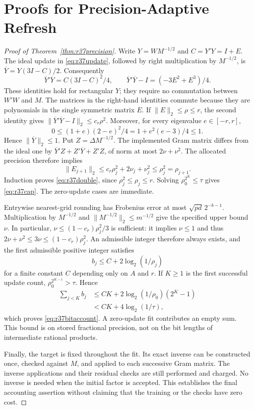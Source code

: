 \documentclass[ecta,nameyear,draft]{econsocart}
\theoremstyle{definition}
\theoremstyle{remark}
\begin{document}
\section{Proofs for Precision-Adaptive Refresh}\label{sec:r37proof}
\begin{proof}[Proof of Theorem~\ref{thm:r37precision}]
Write $Y=WM^{-1/2}$ and $C=Y'Y=I+E$. The ideal update in
\eqref{eq:r37update}, followed by right multiplication by $M^{-1/2}$,
is $\overline Y=Y(3I-C)/2$. Consequently
\[
 \overline Y'\overline Y=C(3I-C)^2/4,
 \qquad \overline Y'\overline Y-I=(-3E^2+E^3)/4.
\]
These identities hold for rectangular $Y$; they require no commutation
between $W'W$ and $M$. The matrices in the right-hand identities commute
because they are polynomials in the single symmetric matrix $E$.
If $\|E\|_2\leq\rho\leq r$, the second identity gives
$\|\overline Y'\overline Y-I\|_2\leq c_r\rho^2$.
Moreover, for every eigenvalue $e\in[-r,r]$,
\[
 0\leq(1+e)(2-e)^2/4=1+e^2(e-3)/4\leq1.
\]
Hence $\|\overline Y\|_2\leq1$. Put $Z=\Delta M^{-1/2}$.
The implemented Gram matrix differs from the ideal one by
$\overline Y'Z+Z'\overline Y+Z'Z$, of norm at most $2\nu+\nu^2$.
The allocated precision therefore implies
\[
 \|E_{j+1}\|_2\leq c_r\rho_j^2+2\nu_j+\nu_j^2
                         \leq\rho_j^2=\rho_{j+1}.
\]
Induction proves \eqref{eq:r37double}, since $\rho_j^2\leq\rho_j\leq r$.
Solving $\rho_0^{2^K}\leq\tau$ gives \eqref{eq:r37cap}. The zero-update
cases are immediate.

Entrywise nearest-grid rounding has Frobenius error at most
$\sqrt{pd}\,2^{-b-1}$. Multiplication by $M^{-1/2}$ and
$\|M^{-1/2}\|_2\leq m^{-1/2}$ give the specified upper bound $\nu$.
In particular, $\nu\leq(1-c_r)\rho_j^2/3$ is sufficient: it implies
$\nu\leq1$ and thus $2\nu+\nu^2\leq3\nu\leq(1-c_r)\rho_j^2$.
An admissible integer therefore always exists, and the first admissible
positive integer satisfies
\[
 b_j\leq C+2\log_2(1/\rho_j)
\]
for a finite constant $C$ depending only on $A$ and $r$. If $K\geq1$ is
the first successful update count, $\rho_0^{2^{K-1}}>\tau$. Hence
\begin{align*}
 \sum_{j<K} b_j
 &\leq CK+2\log_2(1/\rho_0)(2^K-1)\\
 &<CK+4\log_2(1/\tau),
\end{align*}
which proves \eqref{eq:r37bitaccount}. A zero-update fit contributes an
empty sum. This bound is on stored fractional precision, not on the bit
lengths of intermediate rational products.

Finally, the target is fixed throughout the fit. Its exact inverse can be
constructed once, checked against $M$, and applied to each successive Gram
matrix. The inverse applications and their residual checks are still
performed and charged. No inverse is needed when the initial factor is
accepted. This establishes the final accounting assertion without claiming
that the training or the checks have zero cost.
\end{proof}
\end{document}

